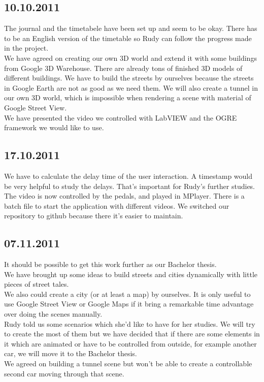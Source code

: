 \subsection*{10.10.2011}
The journal and the timetabele have been set up and seem to be okay. There has to be an English version of the timetable so Rudy can follow the progress made in the project. \\
We have agreed on creating our own 3D world and extend it with some buildings from Google 3D Warehouse. There are already tons of finished 3D models of different buildings. We have to build the streets by ourselves because the streets in Google Earth are not as good as we need them. We will also create a tunnel in our own 3D world, which is impossible when rendering a scene with material of Google Street View. \\
We have presented the video we controlled with LabVIEW and the OGRE framework we would like to use. 
\subsection*{17.10.2011}
We have to calculate the delay time of the user interaction. A timestamp would be very helpful to study the delays. That's important for Rudy's further studies. \\
The video is now controlled by the pedals, and played in MPlayer. There is a batch file to start the application with different videos.
We switched our repository to github because there it's easier to maintain.  
\subsection*{07.11.2011}
It should be possible to get this work further as our Bachelor thesis.\\
We have brought up some ideas to build streets and cities dynamically with little pieces of street tales. \\
We also could create a city (or at least a map) by ourselves. It is only useful to use Google Street View or Google Maps if it bring a remarkable time advantage over doing the scenes manually.\\
Rudy told us some scenarios which she'd like to have for her studies. We will try to create the most of them but we have decided that if there are some elements in it which are animated or have to be controlled from outside, for example another car, we will move it to the Bachelor thesis.  \\
We agreed on building a tunnel scene but won't be able to create a controllable second car moving through that scene. 
